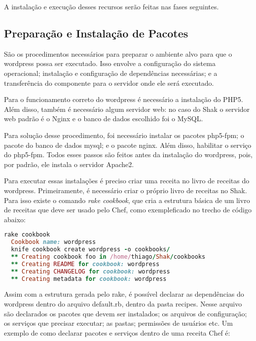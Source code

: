 A instalação e execução desses recursos serão feitas nas fases seguintes.

\subsection{Preparação e Instalação de Pacotes}
\label{wordpress:preparacao}

São os procedimentos necessários para preparar o ambiente alvo para que o wordpress
possa ser executado. Isso envolve a configuração do sistema operacional; instalação
e configuração de dependências necessárias; e a transferência do componente
para o servidor onde ele será executado.

Para o funcionamento correto do wordpress é necessário a instalação do PHP5. Além
disso, também é necessário algum servidor web: no caso do Shak o servidor
web padrão é o Nginx e o banco de dados escolhido foi o MySQL.

Para solução desse procedimento, foi necessário instalar os pacotes php5-fpm; o pacote
do banco de dados mysql; e o pacote nginx. Além disso, habilitar o serviço do
php5-fpm. Todos esses passos são feitos antes da instalação do wordpress,
pois, por padrão, ele instala o servidor
Apache2.

Para executar essas instalações é preciso criar uma receita no livro de receitas
do wordpress. Primeiramente, é necessário criar o próprio livro de receitas no Shak.
Para isso existe o comando \textit{rake cookbook}, que cria a estrutura básica
de um livro de receitas que deve ser usado pelo Chef, como exempleficado no trecho
de código abaixo:

\begin{lstlisting}[language=Ruby,label=dice_index,caption={Exemplo de criação de estrutura básica de livro de receitas do wordpress com shak}]
  rake cookbook
  Cookbook name: wordpress
  knife cookbook create wordpress -o cookbooks/
  ** Creating cookbook foo in /home/thiago/Shak/cookbooks
  ** Creating README for cookbook: wordpress
  ** Creating CHANGELOG for cookbook: wordpress
  ** Creating metadata for cookbook: wordpress
\end{lstlisting}

Assim com a estrutura gerada pelo rake, é possível declarar as dependências do wordpress
dentro do arquivo default.rb, dentro da pasta recipes. Nesse arquivo são declarados
os pacotes que devem ser instalados; os arquivos de configuração;
os serviços que precisar executar; as pastas; permissões de usuários etc. Um exemplo
de como declarar pacotes e serviços dentro de uma receita Chef é:

